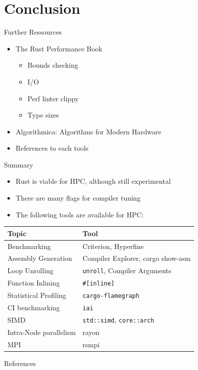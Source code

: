 \documentclass[compress,aspectratio=169]{beamer}
\begin{document}
\section{Conclusion}
\begin{frame}{Further Ressources}
  \begin{itemize}
    \item The Rust Performance Book \cite{perfbook}
      \begin{itemize}
        \item Bounds checking
        \item I/O
        \item Perf linter clippy
        \item Type sizes
      \end{itemize}
      \pause
    \item Algorithmica: Algorithms for Modern Hardware \cite{algorithmica}
      \pause
    \item References to each tools
  \end{itemize}
\end{frame}

\begin{frame}{Summary}
\label{pg:lastpage} %
  \begin{itemize}
    \item Rust is viable for HPC, although still experimental
      \pause
    \item There are many flags for compiler tuning
      \pause
    \item The following tools are available for HPC:
      \pause
  \end{itemize}
  \begin{table}[h]
\centering
    \begin{tabular}{|l|l|}
      \hline
      \textbf{Topic} & \textbf{Tool}\\
      \hline
      Benchmarking & Criterion, Hyperfine\\
      \hline
      Assembly Generation & Compiler Explorer, cargo show-asm\\
      \hline
      Loop Unrolling & \texttt{unroll}, Compiler Arguments\\
      \hline
      Function Inlining & \texttt{\#[inline]} \\
      \hline
      Statistical Profiling & \texttt{cargo-flamegraph} \\
      \hline
      CI benchmarking & \texttt{iai} \\
      \hline
      SIMD & \texttt{std::simd}, \texttt{core::arch} \\
      \hline
      Intra-Node parallelism & rayon \\
      \hline
      MPI & rsmpi \\
      \hline
    \end{tabular}
  \end{table}
\end{frame}

\begin{frame}[allowframebreaks]{References}
\renewcommand*{\bibfont}{\normalfont\scriptsize}
\printbibliography
\end{frame}
\end{document}
